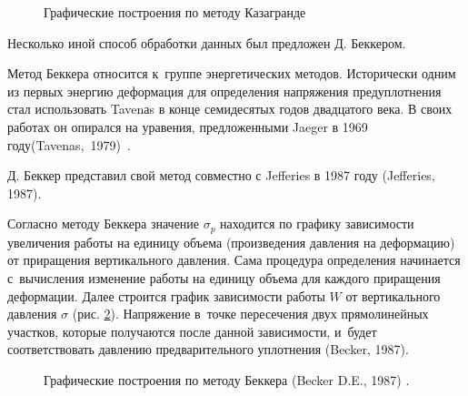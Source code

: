  \begin{figure}[h]
  \centering
  \small

  
  \caption{Графические построения по методу Казагранде}
  \label{eq:caz}
\end{figure}


Несколько иной способ обработки данных был предложен Д. Беккером. 

Метод Беккера относится к~группе энергетических методов.
Исторически одним из первых энергию деформация для определения напряжения предуплотнения стал использовать Tavenаs в конце семидесятых годов двадцатого века. В своих работах он опирался на уравения, предложенными Jaeger в 1969 году(Tavenas,~1979)~\cite{tavenas1979}.

Д. Беккер представил свой метод совместно с Jefferies в 1987 году (Jefferies, 1987)\cite{jeff1987}.

Согласно методу Беккера значение $\sigma_p$ находится по графику зависимости увеличения работы на единицу объема (произведения давления на деформацию) от приращения вертикального давления. 
Сама процедура определения начинается с~вычисления изменение работы на единицу объема для каждого приращения деформации. 
Далее строится график зависимости работы $W$ от вертикального давления $\sigma$ (рис. \ref{eq:beck}). 
Напряжение в~точке пересечения двух прямолинейных участков, 
которые получаются после данной зависимости, 
и~будет соответствовать давлению предварительного уплотнения (Becker, 1987)\cite{becker1987}.

\begin{figure}[ht]
  \centering
  \small
  
  \caption{Графические построения по методу Беккера (Becker D.E., 1987) \cite{becker1987}.}
  \label{eq:beck}
\end{figure}



